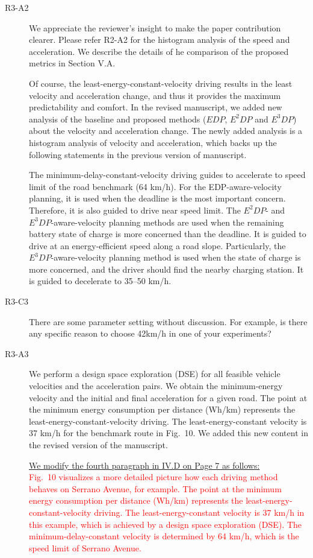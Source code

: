 \documentclass[onecolumn]{IEEEconf}
\begin{document}
\begin{description}
\item [R3-A2] We appreciate the reviewer's insight to make the paper contribution clearer. Please refer R2-A2 for the histogram analysis of the speed and acceleration. We describe the details of he comparison of the proposed metrics in Section V.A. 

Of course, the least-energy-constant-velocity driving results in the least velocity and acceleration change, and thus it provides the maximum predictability and comfort. In the revised manuscript, we added new analysis of the baseline and proposed methods ($EDP$, $E^2DP$ and $E^3DP$) about the velocity and acceleration change. The newly added analysis is a histogram analysis of velocity and acceleration, which backs up the following statements in the previous version of manuscript.

The minimum-delay-constant-velocity driving guides to accelerate to speed limit of the road benchmark (64 km/h). For the EDP-aware-velocity planning, it is used when the deadline is the most important concern. Therefore, it is also guided to drive near speed limit. The $E^2DP$- and $E^3DP$-aware-velocity planning methods are used when the remaining battery state of charge is more concerned than the deadline. It is guided to drive at an energy-efficient speed along a road slope. Particularly, the $E^3DP$-aware-velocity planning method is used when the state of charge is more concerned, and the driver should find the nearby charging station. It is guided to decelerate to 35--50 km/h.


\item [R3-C3] There are some parameter setting without discussion. For example, is there any specific reason to choose 42km/h in one of your experiments?

\item [R3-A3] We perform a design space exploration (DSE) for all feasible vehicle velocities and the acceleration pairs. We obtain the minimum-energy velocity and the initial and final acceleration for a given road. The point at the minimum energy consumption per distance (Wh/km) represents the least-energy-constant-velocity driving. The least-energy-constant velocity is 37 km/h for the benchmark route in Fig.~10. We added this new content in the revised version of the manuscript. 

\uline{We modify the fourth paragraph in IV.D on Page 7 as follows:}\\
\textcolor{red}{
Fig.~10 visualizes a more detailed picture how each driving method behaves on Serrano Avenue, for example. 
The point at the minimum energy consumption per distance (Wh/km) represents the least-energy-constant-velocity driving. The least-energy-constant velocity is 37 km/h in this example, which is achieved by a design space exploration (DSE). The minimum-delay-constant velocity is determined by 64 km/h, which is the speed limit of Serrano Avenue.}


\end{description}
\end{document}
